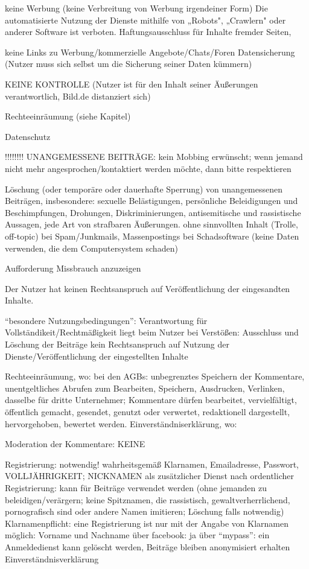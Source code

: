	keine Werbung (keine Verbreitung von Werbung irgendeiner Form)
	Die automatisierte Nutzung der Dienste mithilfe von „Robots", „Crawlern" oder anderer Software ist verboten.
	Haftungsausschluss für Inhalte fremder Seiten, 
	
	
	keine Links zu Werbung/kommerzielle Angebote/Chats/Foren
	Datensicherung (Nutzer muss sich selbst um die Sicherung seiner Daten kümmern)
	
	KEINE KONTROLLE (Nutzer ist für den Inhalt seiner Äußerungen verantwortlich, Bild.de distanziert sich)
	
	Rechteeinräumung (siehe Kapitel)
	
	Datenschutz
	
	
!!!!!!!!	UNANGEMESSENE BEITRÄGE:
	kein Mobbing erwünscht; wenn jemand nicht mehr angesprochen/kontaktiert werden möchte, dann bitte respektieren
	
	Löschung (oder temporäre oder dauerhafte Sperrung) von unangemessenen Beiträgen, insbesondere:     
	sexuelle Belästigungen, 
	persönliche Beleidigungen und Beschimpfungen,
    	Drohungen,
    	Diskriminierungen,
    	antisemitische und rassistische Aussagen,
    	jede Art von strafbaren Äußerungen.
	ohne sinnvollten Inhalt (Trolle, off-topic)
	bei Spam/Junkmails, Massenpostings
	bei Schadsoftware (keine Daten verwenden, die dem Computersystem schaden)
	
	Aufforderung Missbrauch anzuzeigen
	
	Der Nutzer hat keinen Rechtsanspruch auf Veröffentlichung der eingesandten Inhalte.

	
	
	
	``besondere Nutzungsbedingungen'':
			Verantwortung für Vollständikeit/Rechtmäßigkeit liegt beim Nutzer
			bei Verstößen: Ausschluss und Löschung der Beiträge
			kein Rechtsanspruch auf Nutzung der Dienste/Veröffentlichung der eingestellten Inhalte
			
			
			
			
	Rechteeinräumung, wo: bei den AGBs: unbegrenztes Speichern der Kommentare, unentgeltliches Abrufen zum Bearbeiten, Speichern, Ausdrucken, Verlinken, 										dasselbe für dritte Unternehmer; Kommentare dürfen bearbeitet, vervielfältigt, öffentlich gemacht, gesendet, genutzt oder 										verwertet, redaktionell dargestellt, hervorgehoben, bewertet werden.
	Einverständniserklärung, wo:
	
Moderation der Kommentare: KEINE




Registrierung:  notwendig! wahrheitsgemäß Klarnamen, Emailadresse, Passwort, VOLLJÄHRIGKEIT; NICKNAMEN als zusätzlicher Dienst nach ordentlicher Registrierung: kann für Beiträge verwendet werden (ohne jemanden zu beleidigen/verärgern; keine Spitznamen, die rassistisch, gewaltverherrlichend, pornografisch sind oder andere Namen imitieren; Löschung falls notwendig)
	 Klarnamenpflicht: eine Registrierung ist nur mit der Angabe von Klarnamen möglich: Vorname und Nachname
	 über facebook: ja
	 über ``mypass'': ein Anmeldedienst 	
	 kann gelöscht werden, Beiträge bleiben anonymisiert erhalten
	 Einverständnisverklärung
	 

